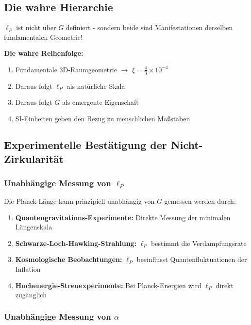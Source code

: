 	\subsection{Die wahre Hierarchie}
	
	\begin{tcolorbox}[colback=green!5!white,colframe=green!75!black,title=Korrekte Interpretation]
		$\ell_P$ ist nicht über $G$ definiert - sondern beide sind Manifestationen derselben fundamentalen Geometrie!
		
		\textbf{Die wahre Reihenfolge:}
		\begin{enumerate}
			\item Fundamentale 3D-Raumgeometrie $\rightarrow$ $\xi = \frac{4}{3} \times 10^{-4}$
			\item Daraus folgt $\ell_P$ als natürliche Skala
			\item Daraus folgt $G$ als emergente Eigenschaft  
			\item SI-Einheiten geben den Bezug zu menschlichen Maß{}stäben
		\end{enumerate}
	\end{tcolorbox}
	
	\subsection{Experimentelle Bestätigung der Nicht-Zirkularität}
	
	\subsubsection{Unabhängige Messung von $\ell_P$}
	
	Die Planck-Länge kann prinzipiell unabhängig von $G$ gemessen werden durch:
	
	\begin{enumerate}
		\item \textbf{Quantengravitations-Experimente:} Direkte Messung der minimalen Längenskala
		\item \textbf{Schwarze-Loch-Hawking-Strahlung:} $\ell_P$ bestimmt die Verdampfungsrate
		\item \textbf{Kosmologische Beobachtungen:} $\ell_P$ beeinflusst Quantenfluktuationen der Inflation
		\item \textbf{Hochenergie-Streuexperimente:} Bei Planck-Energien wird $\ell_P$ direkt zugänglich
	\end{enumerate}
	
	\subsubsection{Unabhängige Messung von $\alpha$}
	
